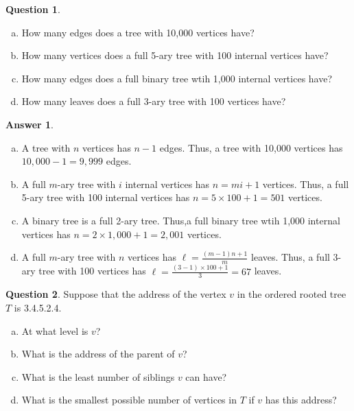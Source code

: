 \documentclass[article, 12pt]{article}
\theoremstyle{definition}
\newtheorem{question}{Question}
\newtheorem{answer}{Answer}
\begin{document}
    \begin{question} \
        \label{q2}
        \begin{enumerate}[a)]
            \item How many edges does a tree with 10,000 vertices have?
            \item How many vertices does a full 5-ary tree with 100 internal vertices have?
            \item How many edges does a full binary tree wtih 1,000 internal vertices have?
            \item How many leaves does a full 3-ary tree with 100 vertices have?
        \end{enumerate}
    \end{question}

    \begin{answer} \
        \label{a2}
        \begin{enumerate}[a)] 
            \item A tree with $n$ vertices has $n-1$ edges. Thus, a tree with 10,000 vertices has $10,000-1=9,999$ edges.
            \item A full $m$-ary tree with $i$ internal vertices has $n=mi+1$ vertices. Thus, a full 5-ary tree with 100 internal vertices has $n=5\times 100+1=501$ vertices.
            \item A binary tree is a full 2-ary tree. Thus,a full binary tree wtih 1,000 internal vertices has $n=2\times 1,000+1=2,001$ vertices.
            \item A full $m$-ary tree with $n$ vertices has $\ell = \frac{(m-1)n + 1}{m}$ leaves. Thus, a full 3-ary tree with 100 vertices has $\ell = \frac{(3-1)\times 100 + 1}{3}=67$ leaves.
        \end{enumerate}
    \end{answer}

    \begin{question}
        \label{q3}
        Suppose that the address of the vertex $v$ in the ordered rooted tree $T$ is 3.4.5.2.4. 
        \begin{enumerate}[a)]
            \item At what level is $v$?
            \item What is the address of the parent of $v$?
            \item What is the least number of siblings $v$ can have?
            \item What is the smallest possible number of vertices in $T$ if $v$ has this address?
        \end{enumerate}
    \end{question}
\end{document}
